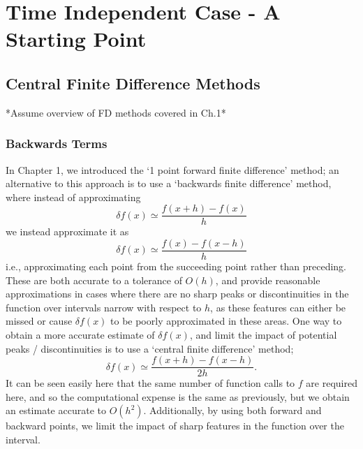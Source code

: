 
\chapter{Time Independent Case - A Starting Point} %

\label{Chapter2} %


\section{Central Finite Difference Methods}
*Assume overview of FD methods covered in Ch.1*
\subsection{Backwards Terms}
In Chapter 1, we introduced the `1 point forward finite difference' method; an alternative to this approach is to use a `backwards finite difference' method, where instead of approximating 
\begin{equation*}
    \delta f\left(x\right) \simeq \frac{f\left(x + h\right) - f\left(x\right)}{h}
\end{equation*}
we instead approximate it as 
\begin{equation*}
    \delta f\left(x\right) \simeq \frac{f\left(x\right) - f\left(x - h\right)}{h}
\end{equation*}
i.e., approximating each point from the succeeding point rather than preceding. 
These are both accurate to a tolerance of $O(h)$, and provide reasonable approximations in cases where there are no sharp peaks or discontinuities in the function over intervals narrow with respect to $h$, as these features can either be missed or cause $\delta f(x)$ to be poorly approximated in these areas. One way to obtain a more accurate estimate of $\delta f(x)$, and limit the impact of potential peaks / discontinuities is to use a `central finite difference' method;
\begin{equation*}
    \delta f\left(x\right) \simeq \frac{f\left(x + h\right) - f\left(x - h\right)}{2h}.
\end{equation*}
It can be seen easily here that the same number of function calls to $f$ are required here, and so the computational expense is the same as previously, but we obtain an estimate accurate to $O(h^{2})$. Additionally, by using both forward and backward points, we limit the impact of sharp features in the function over the interval.


